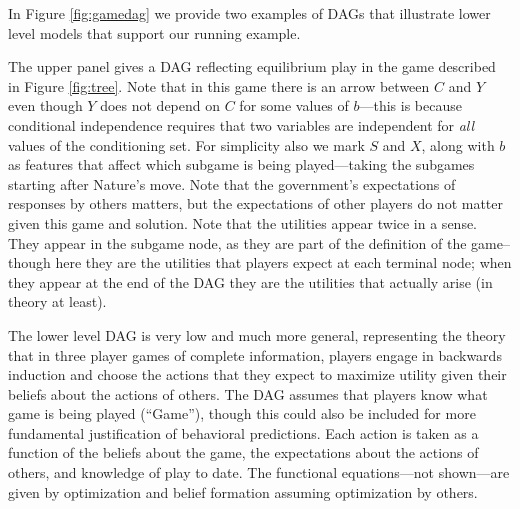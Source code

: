 \documentclass[
  12pt,
]{book}
\begin{document}
In Figure \ref{fig:gamedag} we provide two examples of DAGs that illustrate lower level models that support our running example.

The upper panel gives a DAG reflecting equilibrium play in the game described in Figure \ref{fig:tree}. Note that in this game there is an arrow between \(C\) and \(Y\) even though \(Y\) does not depend on \(C\) for some values of \(b\)---this is because conditional independence requires that two variables are independent for \emph{all} values of the conditioning set. For simplicity also we mark \(S\) and \(X\), along with \(b\) as features that affect which subgame is being played---taking the subgames starting after Nature's move. Note that the government's expectations of responses by others matters, but the expectations of other players do not matter given this game and solution. Note that the utilities appear twice in a sense. They appear in the subgame node, as they are part of the definition of the game--though here they are the utilities that players expect at each terminal node; when they appear at the end of the DAG they are the utilities that actually arise (in theory at least).

The lower level DAG is very low and much more general, representing the theory that in three player games of complete information, players engage in backwards induction and choose the actions that they expect to maximize utility given their beliefs about the actions of others. The DAG assumes that players know what game is being played (``Game''), though this could also be included for more fundamental justification of behavioral predictions. Each action is taken as a function of the beliefs about the game, the expectations about the actions of others, and knowledge of play to date. The functional equations---not shown---are given by optimization and belief formation assuming optimization by others.
\end{document}
